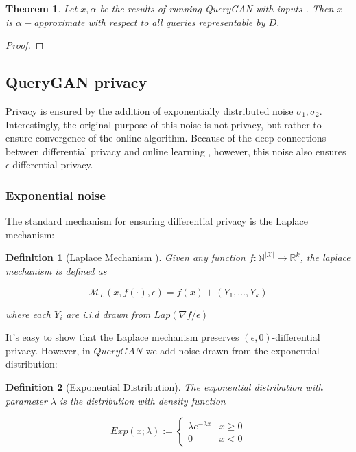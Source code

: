 \documentclass[]{article}
\newtheorem{definition}{Definition}[section]
\newtheorem{theorem}{Theorem}[section]
\theoremstyle{definition}
\begin{document}
\begin{theorem}\label{thm: QueryGAN-Approx}
    Let $x, \alpha$ be the results of running QueryGAN with inputs . Then $x$ is $\alpha-$approximate with respect to all queries representable by $D$.
\end{theorem}

\begin{proof}
\end{proof}


\subsection{QueryGAN privacy}
Privacy is ensured by the addition of exponentially distributed noise $\sigma_1, \sigma_2$. Interestingly, the original purpose of this noise is not privacy, but rather to ensure convergence of the online algorithm. Because of the deep connections between differential privacy and online learning \cite{NRVW19} \cite{GHM19}, however, this noise also ensures $\epsilon$-differential privacy. 

\subsubsection{Exponential noise}

The standard mechanism for ensuring differential privacy is the Laplace mechanism:

\begin{definition}[Laplace Mechanism \cite{DR13}]
    Given any function $f: \mathbb{N}^{|\mathcal{X}|} \to \mathbb{R}^k$, the laplace mechanism is defined as

    \begin{equation}
        \mathcal{M}_L(x, f(\cdot), \epsilon)=f(x)+\left(Y_1, \ldots, Y_k\right)
    \end{equation}

    where each $Y_i$ are i.i.d drawn from $Lap(\nabla f / \epsilon)$
\end{definition}

It's easy to show that the Laplace mechanism preserves $(\epsilon, 0)$-differential privacy. However, in $QueryGAN$ we add noise drawn from the exponential distribution:

\begin{definition}[Exponential Distribution]
    The exponential distribution with parameter $\lambda$ is the distribution with density function

    \begin{equation}
        Exp(x; \lambda) := \left\{\begin{array}{ll}{\lambda e^{-\lambda x}} & {x \geq 0} \\ {0} & {x<0}\end{array}\right.
    \end{equation}
\end{definition}
\end{document}
